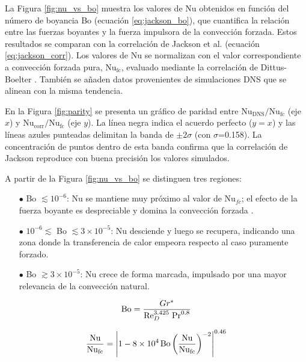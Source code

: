 La Figura \ref{fig:nu_vs_bo} muestra los valores de Nu obtenidos en función del número de boyancia Bo (ecuación \ref{eq:jackson_bo}), que cuantifica la relación entre las fuerzas boyantes y la fuerza impulsora de la convección forzada. Estos resultados se comparan con la correlación de Jackson et al. \cite{jackson1989studies} (ecuación \ref{eq:jackson_corr}). Los valores de Nu se normalizan con el valor \linebreak correspondiente a convección forzada pura, Nu$_{\text{fc}}$, evaluado mediante la correlación de  \linebreak Dittus-Boelter \cite{incropera}. También se añaden datos provenientes de simulaciones DNS \cite{you2003direct} que se alinean con la misma tendencia.

En la Figura \ref{fig:parity} se presenta un gráfico de paridad entre $\text{Nu}_{\text{DNS}}/\text{Nu}_{\text{fc}}$ (eje $x$) y $\text{Nu}_{\text{corr}}/\text{Nu}_{\text{fc}}$ (eje $y$). La línea negra indica el acuerdo perfecto ($y=x$) y las líneas azules punteadas delimitan la banda de $\pm2\sigma$ (con $\sigma$=0.158). La concentración de puntos dentro de esta banda confirma que la correlación de Jackson reproduce con buena precisión los valores simulados.

A partir de la Figura \ref{fig:nu_vs_bo} se distinguen tres regiones:

\begin{itemize}
  \item[$\bullet$] Bo $\lesssim 10^{-6}$: Nu se mantiene muy próximo al valor de Nu$_{fc}$; el efecto de la fuerza boyante es despreciable y domina la convección forzada  \cite{li2021development}.
  \item[$\bullet$] $10^{-6} \lesssim$ Bo $\lesssim 3 \times 10^{-5}$: Nu desciende y luego se recupera, indicando una zona donde la transferencia de calor empeora respecto al caso puramente forzado.
  \item[$\bullet$] Bo $\gtrsim 3 \times 10^{-5}$: Nu crece de forma marcada, impulsado por una mayor relevancia de la convección natural.
\end{itemize}

\begin{equation}
\text{Bo}= \frac{Gr^*}{\text{Re}_D^{3\text{.}425} \hspace*{1mm} \text{Pr}^{0\text{.}8}}
\label{eq:jackson_bo}
\end{equation}

\begin{equation}
\frac{\text{Nu}}{\text{Nu}_{\text{fc}}} =
\left\vert 1 - 8 \times 10^4 \hspace*{0.5mm} \text{Bo}
\left( \frac{\text{Nu}}{\text{Nu}_{\text{fc}}} \right)^{-2} \right\vert^{0\text{.}46}
\label{eq:jackson_corr}
\end{equation}

